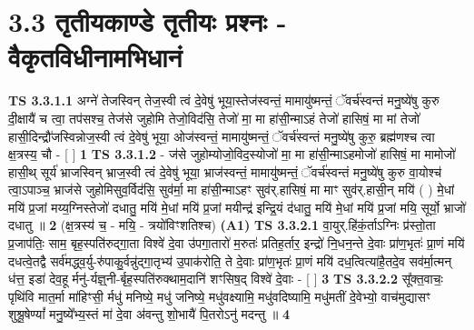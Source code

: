 \documentclass[17pt]{extarticle}
\begin{document}
     \section*{ 3.3     तृतीयकाण्डे तृतीयः प्रश्नः - वैकृतविधीनामभिधानं }
                                        \textbf{ TS 3.3.1.1} \newline
                  अग्ने॑ तेजस्विन् तेज॒स्वी त्वं दे॒वेषु॑ भूया॒स्तेज॑स्वन्तं॒ मामायु॑ष्मन्तं॒ ॅवर्च॑स्वन्तं मनु॒ष्ये॑षु कुरु दी॒क्षायै॑ च त्वा॒ तप॑सश्च॒ तेज॑से जुहोमि तेजो॒विद॑सि॒ तेजो॑ मा॒ मा हा॑सी॒न्माऽहं तेजो॑ हासिषं॒ मा मां तेजो॑ हासी॒दिन्द्रौ॑जस्विन्नोज॒स्वी त्वं दे॒वेषु॑ भूया॒ ओज॑स्वन्तं॒ मामायु॑ष्मन्तं॒ ॅवर्च॑स्वन्तं मनु॒ष्ये॑षु कुरु॒ ब्रह्म॑णश्च त्वा क्ष॒त्रस्य॒ चौ - [  ] \textbf{  1} \newline
                  \newline
                                \textbf{ TS 3.3.1.2} \newline
                  - ज॑से जुहोम्योजो॒विद॒स्योजो॑ मा॒ मा हा॑सी॒न्माऽहमोजो॑ हासिषं॒ मा मामोजो॑ हासी॒थ् सूर्य॑ भ्राजस्विन् भ्राज॒स्वी त्वं दे॒वेषु॑ भूया॒ भ्राज॑स्वन्तं॒ मामायु॑ष्मन्तं॒ ॅवर्च॑स्वन्तं मनु॒ष्ये॑षु कुरु वा॒योश्च॑ त्वा॒ऽपाञ्च॒ भ्राज॑से जुहोमिसुव॒र्विद॑सि॒ सुव॑र्मा॒ मा हा॑सी॒न्माऽहꣳ सुव॑र्.हासिषं॒ मा माꣳ सुव॑र्.हासी॒न् मयि॑ ( ) मे॒धां मयि॑ प्र॒जां मय्य॒ग्निस्तेजो॑ दधातु॒ मयि॑ मे॒धां मयि॑ प्र॒जां मयीन्द्र॑ इन्द्रि॒यं द॑धातु॒ मयि॑ मे॒धां मयि॑ प्र॒जां मयि॒ सूर्यो॒ भ्राजो॑ दधातु ॥ \textbf{  2} \newline
                  \newline
                      (क्ष॒त्रस्य॑ च॒ - मयि॒ - त्रयो॑विꣳशतिश्च)  \textbf{(A1)} \newline \newline
                                        \textbf{ TS 3.3.2.1} \newline
                  वा॒युर्.हि॑कं॒र्ताऽग्निः प्र॑स्तो॒ता प्र॒जाप॑तिः॒ साम॒ बृह॒स्पति॑रुद्गा॒ता विश्वे॑ दे॒वा उ॑पगा॒तारो॑ म॒रुतः॑ प्रतिह॒र्तार॒ इन्द्रो॑ नि॒धन॒न्ते दे॒वाः प्रा॑ण॒भृतः॑ प्रा॒णं मयि॑ दधत्वे॒तद्वै सर्व॑मद्ध्व॒र्यु-रु॑पाकु॒र्वन्नु॑द्गा॒तृभ्य॑ उ॒पाक॑रोति॒ ते दे॒वाः प्रा॑ण॒भृतः॑ प्रा॒णं मयि॑ दध॒त्वित्या॑है॒तदे॒व सव॑र्मा॒त्मन् ध॑त्त॒ इडा॑ देव॒हू र्मनु॑-र्यज्ञ्॒नी-र्बृह॒स्पति॑रुक्थाम॒दानि॑ शꣳसिष॒द् विश्वे॑ दे॒वाः - [  ] \textbf{  3} \newline
                  \newline
                                \textbf{ TS 3.3.2.2} \newline
                  सू᳚क्त॒वाचः॒ पृथि॑वि मात॒र्मा मा॑हिꣳसी॒ र्मधु॑ मनिष्ये॒ मधु॑ जनिष्ये॒ मधु॑वक्ष्यामि॒ मधु॑वदिष्यामि॒ मधु॑मतीं दे॒वेभ्यो॒ वाच॑मुद्यासꣳ शुश्रू॒षेण्यां᳚ मनु॒ष्ये᳚भ्य॒स्तं मा॑ दे॒वा अ॑वन्तु शो॒भायै॑ पि॒तरोऽनु॑ मदन्तु ॥ \textbf{  4} \newline
\end{document}
